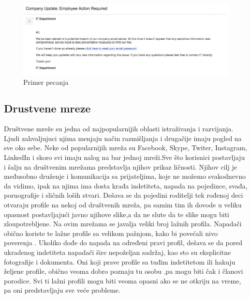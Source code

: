 \documentclass[a4paper]{article}
\newtheorem{primer}{Primer}[section]
\begin{document}
\begin{figure}[h!]
\begin{center}
	\includegraphics[scale=0.5]{msnr_phishing.jpg}
\end{center}
\caption{Primer pecanja }
\label{fig:phishing}
\end{figure}


\subsection{Drustvene mreze}
\label{subsec:podnaslovIP3}

Društvene mreže su jedna od najpopularnijih oblasti istraživanja i razvijanja. Ljudi zahvaljujuci njima menjaju način razmišljanja i drugačije imaju pogled na sve oko sebe. Neke od popularnijih mreža su Facebook, Skype, Twiter, Instagram, LinkedIn i skoro svi imaju nalog na bar jednoj mreži.Sve što korisnici postavljaju i šalju na društvenim mrežama predstavlja njihov prikaz ličnosti. Njihov cilj je međusobno druženje i komunikacija sa prijateljima, koje ne možemo svakodnevno da vidimo, ipak na njima ima dosta krađa indetiteta, napada na pojedince, svađa, pornografije i sličnih loših stvari. Dešava se da pojedini roditelji tek rođenoj deci otvaraju profile na nekoj od društvenih mreža, pa samim tim ih dovode u veliku opasnost postavljajući javno njihove slike,a da ne slute da te slike mogu biti zloupotrebljene. Na ovim mrežama se javalja veliki broj lažnih profila. Napadači obično koriste te lažne profile sa velikom pažnjom, kako bi povećali nivo poverenja \cite{fakePr} . Ukoliko dođe do napada na određeni pravi profil, dešava se da pored ukradenog indetiteta  napadači šire nepoželjan sadržaj, kao sto su eksplicitne fotografije i dokumenta. Oni koji prave profile sa tuđim indetitetom ili hakuju željene profile, obično veoma dobro poznaju tu osobu ,pa  mogu biti čak i članovi porodice. Svi ti lažni profili mogu biti veoma opasni ako se ne otkriju na vreme, pa oni predstavljaju sve veće probleme.
\end{document}
